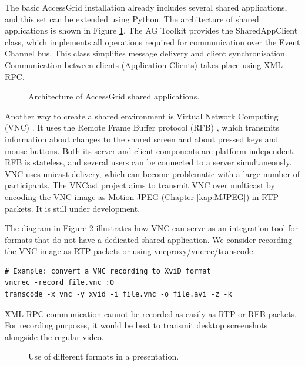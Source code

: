 The basic AccessGrid installation already includes several shared applications, and this set can be extended using Python. The architecture of shared applications is shown in Figure \ref{fig:ArchAGSharedApp}. The AG Toolkit provides the SharedAppClient class, which implements all operations required for communication over the Event Channel bus. This class simplifies message delivery and client synchronisation. Communication between clients (Application Clients) takes place using XML-RPC.

\begin{figure}
\centering

\caption{Architecture of AccessGrid shared applications.}
\label{fig:ArchAGSharedApp}
\end{figure}

Another way to create a shared environment is Virtual Network Computing (VNC) \cite{MAN-Virtual-Network-Computing}. It uses the Remote Frame Buffer protocol (RFB) \cite{MAN-RFB-Protocol}, which transmits information about changes to the shared screen and about pressed keys and mouse buttons. Both its server and client components are platform-independent. RFB is stateless, and several users can be connected to a server simultaneously. VNC uses unicast delivery, which can become problematic with a large number of participants. The VNCast project \cite{Vislab-VNCast} aims to transmit VNC over multicast by encoding the VNC image as Motion JPEG (Chapter \ref{kap:MJPEG}) in RTP packets. It is still under development.

The diagram in Figure \ref{fig:PresentationFileFormats} illustrates how VNC can serve as an integration tool for formats that do not have a dedicated shared application. We consider recording the VNC image as RTP packets or using vncproxy/vncrec/transcode.

\begin{verbatim}
# Example: convert a VNC recording to XviD format
vncrec -record file.vnc :0
transcode -x vnc -y xvid -i file.vnc -o file.avi -z -k
\end{verbatim}

XML-RPC communication cannot be recorded as easily as RTP or RFB packets. For recording purposes, it would be best to transmit desktop screenshots alongside the regular video.

\begin{figure}
\centering

\caption{Use of different formats in a presentation.}
\label{fig:PresentationFileFormats}
\end{figure}

